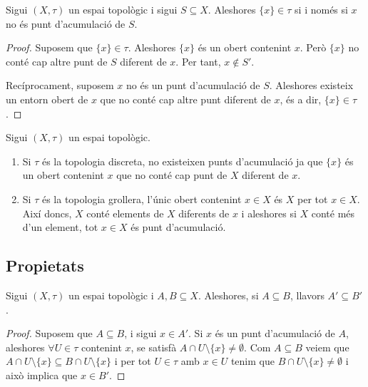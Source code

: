 \documentclass[../main.tex]{subfiles}
\begin{document}
\begin{coro}
\label{coro:acumulacio4} Sigui $(X,\tau)$ un espai topològic i sigui $S\subseteq X$. Aleshores $\{x\}\in\tau$ si i només si $x$ no és punt d'acumulació de $S$.
\end{coro}
\begin{proof}
Suposem que $\{x\}\in\tau$. Aleshores $\{x\}$ és un obert contenint $x$. Però $\{x\}$ no conté cap altre punt de $S$ diferent de $x$. Per tant, $x\not\in S'$.

Recíprocament, suposem $x$ no és un punt d'acumulació de $S$. Aleshores existeix un entorn obert de $x$ que no conté cap altre punt diferent de $x$, és a dir, $\{x\}\in\tau$.
\end{proof}

\begin{ej}
\label{ej:acumulacio5} Sigui $(X,\tau)$ un espai topològic.
\begin{enumerate}[(1)]
    \item Si $\tau$ és la topologia discreta, no existeixen punts d'acumulació ja que $\{x\}$ és un obert contenint $x$ que no conté cap punt de $X$ diferent de $x$.
    \item Si $\tau$ és la topologia grollera, l'únic obert contenint $x\in X$ és $X$ per tot $x\in X$. Així doncs, $X$ conté elements de $X$ diferents de $x$ i aleshores si $X$ conté més d'un element, tot $x\in X$ és punt d'acumulació.
\end{enumerate}
\end{ej}

\subsection{Propietats}

\begin{prop}
\label{prop:propietat1acumulacio} Sigui $(X,\tau)$ un espai topològic i $A,B\subseteq X$. Aleshores, si $A\subseteq B$, llavors $A'\subseteq B'$.
\end{prop}
\begin{proof}
Suposem que $A\subseteq B$, i sigui $x\in A'$. Si $x$ és un punt d'acumulació de $A$, aleshores $\forall U\in\tau$ contenint $x$, se satisfà $A\cap U\setminus\{x\} \not=\emptyset$. Com $A\subseteq B$ veiem que $A\cap U\setminus\{x\}\subseteq B\cap U\setminus\{x\}$ i per tot $U\in\tau$ amb $x\in U$ tenim que $B\cap U\setminus\{x\}\not=\emptyset$ i això implica que $x\in B'$.
\end{proof}
\end{document}
